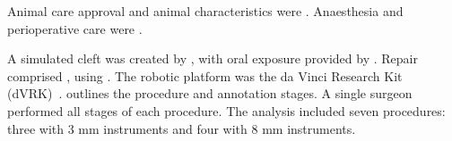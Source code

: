 Animal care approval and animal characteristics were \verifytext{ breed, sex, age, and weight]}. Anaesthesia and perioperative care were .

A simulated cleft was created by , with oral exposure provided by . Repair comprised , using . The robotic platform was the da Vinci Research Kit (dVRK)~\cite{kazanzides2014dvrk}.  outlines the procedure and annotation stages.
A single surgeon performed all stages of each procedure. The analysis included seven procedures: three with 3 mm instruments and four with 8 mm instruments. 
